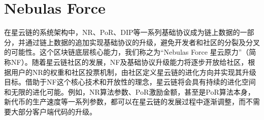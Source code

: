 \section{Nebulas Force }
在星云链的系统架构中，NR、PoR、DIP等一系列基础协议成为链上数据的一部分，并通过链上数据的追加实现基础协议的升级，避免开发者和社区的分裂及分叉的可能性。这个区块链底层核心能力，我们称之为“Nebulas Force 星云原力”（简称NF）。随着星云链社区的发展，NF及基础协议升级能力将逐步开放给社区，根据用户的NR的权重和社区投票机制，由社区定义星云链的进化方向并实现其升级目标。借助于NF这个核心技术和开放性的理念，星云链将会具有持续的进化空间和无限的进化可能。例如，NR算法参数、PoR激励金额，甚至是PoR算法本身，新代币的生产速度等一系列参数，都可以在星云链的发展过程中逐渐调整，而不需要大部分客户端代码的升级。